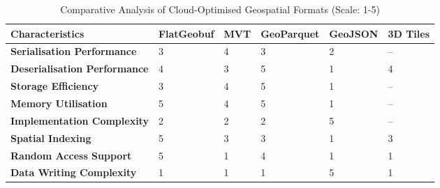 \begin{table}[htbp]
  \centering
  \caption{Comparative Analysis of Cloud-Optimised Geospatial Formats (Scale: 1-5)}
  \label{tab:format-comparison}
  \footnotesize
  \begin{tabular}{p{3cm}|p{1.8cm}|p{1.8cm}|p{1.8cm}|p{1.8cm}|p{1.8cm}}
    \hline
    \textbf{Characteristics} & \textbf{FlatGeobuf} & \textbf{MVT} & \textbf{GeoParquet} & \textbf{GeoJSON} & \textbf{3D Tiles} \\
    \hline
    \textbf{Serialisation Performance} & 3 & 4 & 3 & 2 & -- \\
    \hline
    \textbf{Deserialisation Performance} & 4 & 3 & 5 & 1 & 4\footnotemark[1] \\
    \hline
    \textbf{Storage Efficiency} & 3 & 4 & 5 & 1 & -- \\
    \hline
    \textbf{Memory Utilisation} & 5 & 4 & 5 & 1 & -- \\
    \hline
    \textbf{Implementation Complexity} & 2 & 2 & 2 & 5 & -- \\
    \hline
    \textbf{Spatial Indexing} & 5 & 3\footnotemark[2] & 3\footnotemark[3] & 1 & 3\footnotemark[4] \\
    \hline
    \textbf{Random Access Support} & 5 & 1 & 4 & 1 & 1 \\
    \hline
    \textbf{Data Writing Complexity} & 1 & 1 & 1 & 5 & 1 \\
    \hline
  \end{tabular}
\end{table}


